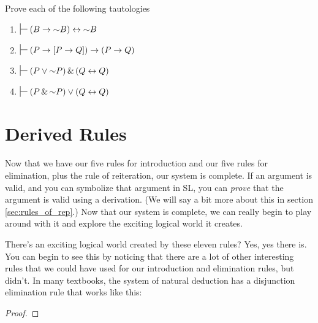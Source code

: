 \noindent\problempart
Prove each of the following tautologies
\begin{enumerate}[label=(\arabic*)]
\item $\sststile{}{} (B \eif \enot B) \eiff \enot B$


\item $\sststile{}{} (P \eif [P \eif Q]) \eif (P \eif Q)$ %

\item $\sststile{}{} (P \eor \enot P) \eand (Q \eiff Q) $ %

\item $\sststile{}{} (P \eand \enot P) \eor  (Q \eiff Q)$%

\end{enumerate}


\section{Derived Rules}
\setlength{\parindent}{1em}


Now that we have our five rules for introduction and our five rules for elimination, plus the rule of reiteration, our system is complete. If an argument is valid, and you can symbolize that argument in SL, you can \emph{prove} that the argument is valid using a derivation. (We will say a bit more about this in section \ref{sec:rules_of_rep}.) Now that our system is complete, we can really begin to play around with it and explore the exciting  logical world it creates.

There's an exciting logical world created by these eleven rules? Yes, yes there is. You can begin to see this by noticing that there are a lot of other interesting rules that we could have used for our introduction and elimination rules, but didn't. In many textbooks, the system of natural deduction has a disjunction elimination rule that works like this:

\begin{proof}
	 
\end{proof}

